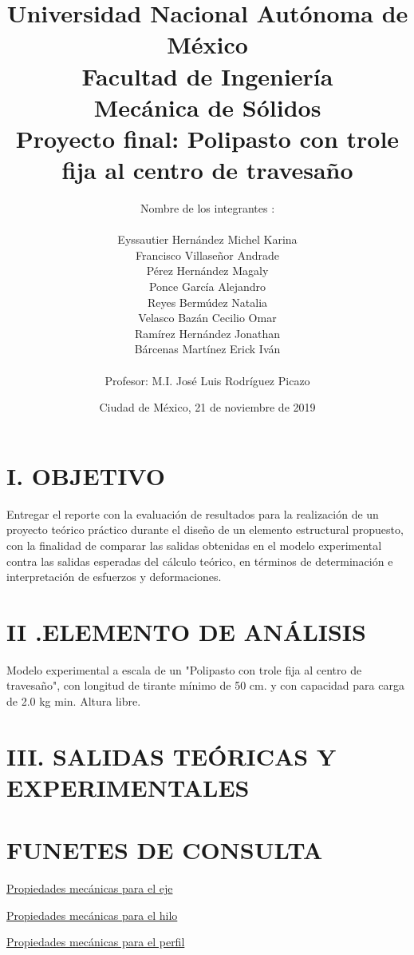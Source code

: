 \documentclass[12pt,a4paper]{report}
\author{Nombre de los integrantes :\\\\Eyssautier Hernández Michel Karina\\
Francisco Villaseñor Andrade\\
Pérez Hernández Magaly\\
Ponce García Alejandro\\
Reyes Bermúdez Natalia\\
Velasco Bazán Cecilio Omar\\
Ramírez Hernández Jonathan\\
Bárcenas Martínez Erick Iván
\\\\Profesor: M.I. José Luis Rodríguez Picazo}
\date{Ciudad de México, 21 de noviembre de 2019}
\title{Universidad Nacional Autónoma de México\\Facultad de Ingeniería\\Mecánica de Sólidos\\Proyecto final: Polipasto con trole fija al centro de travesaño}
\begin{document}
\maketitle


\chapter*{I. OBJETIVO}
Entregar el reporte con la evaluación de resultados para la realización de un proyecto teórico práctico durante el diseño de un elemento estructural propuesto, con la finalidad de comparar las salidas obtenidas en el modelo experimental contra las salidas esperadas del cálculo teórico, en términos de determinación e interpretación de esfuerzos y deformaciones.

\chapter*{II .ELEMENTO DE ANÁLISIS}
Modelo experimental a escala de un "Polipasto con trole fija al centro de \\travesaño", con longitud de tirante mínimo de 50 cm. y con capacidad para carga \\de 2.0 kg min. Altura libre.

\chapter*{III. SALIDAS TEÓRICAS Y EXPERIMENTALES}
  

  

  

  

  

  

\chapter*{FUNETES DE CONSULTA}

\href{https://ingemecanica.com/tutorialsemanal/tutorialn110.html}{Propiedades mecánicas para el eje }

\href{http://www.rmmcia.es/blog/laton-y-cobre/propiedades-del-laton}{Propiedades mecánicas para el hilo }

\href{https://repository.unilibre.edu.co/bitstream/handle/10901/7826/VasquezTorresEdwinLibardo2013Anexos.pdf?sequence=2}{Propiedades mecánicas para el perfil }
\end{document}
